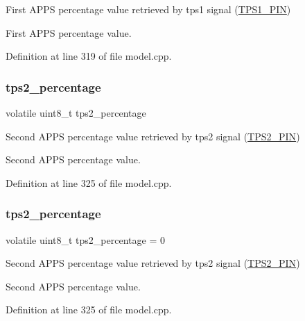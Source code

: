 First A\+P\+PS percentage value retrieved by tps1 signal (\mbox{\hyperlink{group___board__pinout__group_gae9aa914854f611488701c96a330b0bd4}{T\+P\+S1\+\_\+\+P\+IN}}) 

First A\+P\+PS percentage value. 

Definition at line 319 of file model.\+cpp.

\mbox{\label{group___board__model__group_gaf69d82f83885abc5adbd5fcbf4c421cf}} 
\subsubsection{\texorpdfstring{tps2\+\_\+percentage}{tps2\_percentage}\hspace{0.1cm}{\footnotesize\ttfamily [1/2]}}
{\footnotesize\ttfamily volatile uint8\+\_\+t tps2\+\_\+percentage}



Second A\+P\+PS percentage value retrieved by tps2 signal (\mbox{\hyperlink{group___board__pinout__group_gab13a816bae3ca994897fc6f1cb590a67}{T\+P\+S2\+\_\+\+P\+IN}}) 

Second A\+P\+PS percentage value. 

Definition at line 325 of file model.\+cpp.

\mbox{\label{group___board__model__group_gaf69d82f83885abc5adbd5fcbf4c421cf}} 
\subsubsection{\texorpdfstring{tps2\+\_\+percentage}{tps2\_percentage}\hspace{0.1cm}{\footnotesize\ttfamily [2/2]}}
{\footnotesize\ttfamily volatile uint8\+\_\+t tps2\+\_\+percentage = 0}



Second A\+P\+PS percentage value retrieved by tps2 signal (\mbox{\hyperlink{group___board__pinout__group_gab13a816bae3ca994897fc6f1cb590a67}{T\+P\+S2\+\_\+\+P\+IN}}) 

Second A\+P\+PS percentage value. 

Definition at line 325 of file model.\+cpp.

